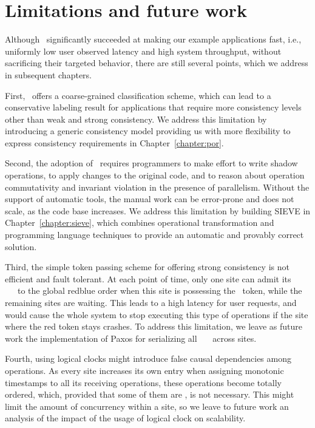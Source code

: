 \section{Limitations and future work}
\label{ch:redblue:sect:limitation}
Although \RBc\ significantly succeeded at making our example applications fast, i.e.,
uniformly low user observed latency and high system throughput, without sacrificing
their targeted behavior, 
there are still several points, which we address in subsequent chapters.

First, \RBc\ offers a coarse-grained classification scheme, which can
lead to a conservative labeling result for applications that require
more consistency levels other than weak and strong consistency. We address this limitation by introducing
a generic consistency model providing us with more flexibility to express consistency requirements in Chapter~\ref{chapter:por}.

Second, the adoption of \RBc\ requires programmers to make effort to write shadow operations,
to apply changes to the original code,
and to reason about operation commutativity and invariant violation in
the presence of parallelism. Without the support of automatic tools, the 
manual work can be error-prone and does not scale, as
the code base increases. We address
this limitation by building SIEVE in Chapter~\ref{chapter:sieve},
which combines operational transformation and programming language techniques
to provide an automatic and provably correct solution.

Third, the simple token passing scheme for offering
strong consistency is not efficient and fault tolerant. At each point of time,
only one site can admit its \red\ \shadow\ \operations\ to the global
redblue order when this site is possessing
the \red\ token, while the remaining sites are waiting. This leads to a high latency
for user requests, and would cause the whole system to stop
executing this type of operations if the site where the red token stays crashes.
To address this limitation, we leave as future work
the implementation of Paxos for serializing all \red\ \shadow\ \operations\ across sites.

Fourth, using logical clocks might introduce false causal dependencies among
operations. As every site increases its own entry when assigning monotonic
timestamps to all its receiving operations, these operations become totally ordered, which,
provided that some of them are \blue, is not necessary. This might limit the 
amount of concurrency within a site, so we leave to future work
an analysis of the impact of the usage of logical clock on scalability.

